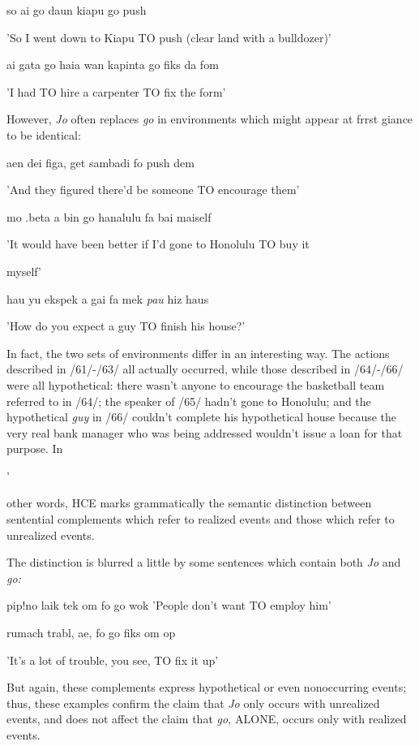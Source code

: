 \ea\label{ex:62}
 so ai go daun kiapu go push
\glt
\z

'So I went down to Kiapu TO push (clear land with a bulldozer)'

\ea\label{ex:63}
 ai gata go haia wan kapinta go fiks da fom
\glt
\z

'I had TO hire a carpenter TO fix the form'

However, \textit{Jo }often replaces \textit{go} in environments which might appear at frrst giance to be identical:

\ea\label{ex:64}
 aen dei figa, get sambadi fo push dem
\glt
\z

'And they figured there'd be someone TO encourage them'

\ea\label{ex:65}
 mo .beta a bin go hanalulu fa bai maiself
\glt
\z

'It would have been better if I'd gone to Honolulu TO buy it

myself'

\ea\label{ex:66}
 hau yu ekspek a gai fa mek \textit{pau }hiz haus
\glt
\z

'How do you expect a guy TO finish his house?'

In fact, the two sets of environments differ in an interesting way. The actions described in /61/-/63/ all actually occurred, while those de\-scribed in /64/-/66/ were all hypothetical: there wasn't anyone to encourage the basketball team referred to in /64/; the speaker of /65/ hadn't gone to Honolulu; and the hypothetical \textit{guy} in /66/ couldn't complete his hypothetical house because the very real bank manager who was being addressed wouldn't issue a loan for that purpose. In

'


other words, HCE marks grammatically the semantic distinction be\-tween sentential complements which refer to realized events and those which refer to unrealized events.

The distinction is blurred a little by some sentences which contain both \textit{Jo} and \textit{go:}

\ea\label{ex:67}
 pip!no laik tek om fo go wok 'People don't want TO employ him'
\glt
\z

\ea\label{ex:68}
 rumach trabl, ae, fo go fiks om op
\glt
\z

'It's a lot of trouble, you see, TO fix it up'

But again, these complements express hypothetical or even nonoccur\-ring events; thus, these examples confirm the claim that \textit{Jo} only occurs with unrealized events, and does not affect the claim that \textit{go,} ALONE, occurs only with realized events.

